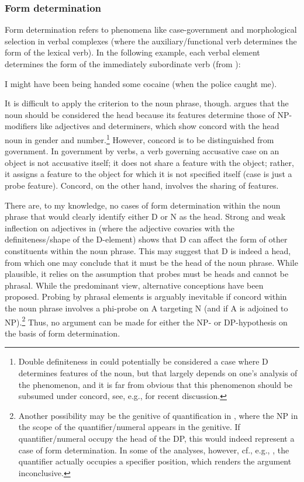 \documentclass[output=paper,colorlinks,citecolor=black,
]{langscibook}
\begin{document}
\subsubsection{Form determination}

Form determination refers to phenomena like case-government and morphological selection in verbal complexes (where the auxiliary/functional verb determines the form of the lexical verb). In the following example, each verbal element determines the form of the immediately subordinate verb (from \citealt[30]{Bruening:2009:DP}):


\ea I might have been being handed some cocaine (when the police caught me).
\z

\noindent
It is difficult to apply the criterion to the noun phrase, though. \citet{Bruening:2009:DP} argues that the noun should be considered the head because its features determine those of NP-modifiers like adjectives and determiners, which show concord with the head noun in gender and number.\footnote{Double definiteness in  could potentially be considered a case where D determines features of the noun, but that largely depends on one's analysis of the phenomenon, and it is far from obvious that this phenomenon should be subsumed under concord, see, e.g., \citet{Schoorlemmer:2012:DefinitenessGermanic} for recent discussion.} However, concord is to be distinguished from government. In government by verbs, a verb governing accusative case on an object is not accusative itself; it does not share a feature with the object; rather, it assigns a feature to the object for which it is not specified itself (case is just a probe feature). Concord, on the other hand, involves the sharing of features. 

 There are, to my knowledge, no cases of form determination within the noun phrase that would clearly identify either D or N as the head. Strong and weak inflection on adjectives in  (where the adjective covaries with the definiteness/shape of the D-element) shows that D can affect the form of other constituents within the noun phrase. This may suggest that D is indeed a head, from which one may conclude that it must be the head of the noun phrase. While plausible, it relies on the assumption that probes must be heads and cannot be phrasal. While the predominant view, alternative conceptions have been proposed. Probing by phrasal elements is arguably inevitable if concord within the noun phrase involves a phi-probe on A targeting N (and if A is adjoined to NP).\footnote{Another possibility may be the genitive of quantification in , where the NP in the scope of the quantifier/numeral appears in the genitive. If quantifier/numeral occupy the head of the DP, this would indeed represent a case of form determination. In some of the analyses, however, cf., e.g., \citet{Boskovic:2006:CaseAgreementGenQuant}, the quantifier actually occupies a specifier position, which renders the argument inconclusive.} 
 Thus, no argument can be made for either the NP- or DP-hypothesis on the basis of form determination.
\end{document}
